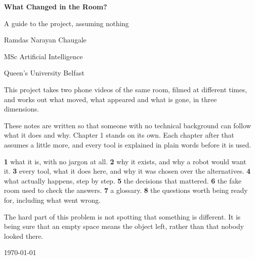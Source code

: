 \documentclass[11pt,a4paper]{report}
\begin{document}
\begin{titlepage}
\centering
\vspace*{2.6cm}
{\Huge\bfseries What Changed in the Room?\par}
\vspace{1.2cm}
{\Large A guide to the project, assuming nothing\par}
\vspace{2.2cm}
{\large Ramdas Narayan Chaugale\par}
\vspace{6pt}
{\large MSc Artificial Intelligence\par}
{\large Queen's University Belfast\par}
\vspace{1.6cm}
\begin{minipage}{0.84\textwidth}
\small
This project takes two phone videos of the same room, filmed at different times, and works out what
moved, what appeared and what is gone, in three dimensions.

\vspace{6pt}
These notes are written so that someone with no technical background can follow what it does and
why. Chapter 1 stands on its own. Each chapter after that assumes a little more, and every tool is
explained in plain words before it is used.

\vspace{8pt}
\textbf{1} what it is, with no jargon at all.
\textbf{2} why it exists, and why a robot would want it.
\textbf{3} every tool, what it does here, and why it was chosen over the alternatives.
\textbf{4} what actually happens, step by step.
\textbf{5} the decisions that mattered.
\textbf{6} the fake room used to check the answers.
\textbf{7} a glossary.
\textbf{8} the questions worth being ready for, including what went wrong.

\vspace{8pt}
The hard part of this problem is not spotting that something is different. It is being sure that an
empty space means the object left, rather than that nobody looked there.
\end{minipage}
\vfill
{\small \today}
\end{titlepage}

\tableofcontents









\end{document}

